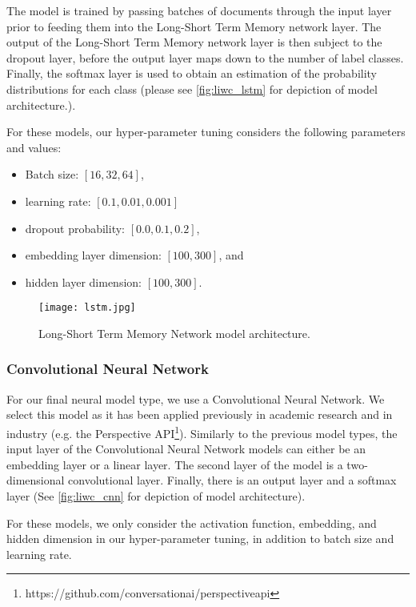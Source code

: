 The model is trained by passing batches of documents through the input layer prior to feeding them into the Long-Short Term Memory network layer. The output of the Long-Short Term Memory network layer is then subject to the dropout layer, before the output layer maps down to the number of label classes. Finally, the softmax layer is used to obtain an estimation of the probability distributions for each class (please see \autoref{fig:liwc_lstm} for depiction of model architecture.).

For these models, our hyper-parameter tuning considers the following parameters and values:

\begin{itemize}
  \item Batch size: $[16, 32, 64]$,
  \item learning rate: $[0.1, 0.01, 0.001]$
  \item dropout probability: $[0.0, 0.1, 0.2]$,
  \item embedding layer dimension: $[100, 300]$, and
  \item hidden layer dimension: $[100, 300]$.
\end{itemize}

\begin{figure}
  \centering
  \texttt{[image: lstm.jpg]}
  \caption{Long-Short Term Memory Network model architecture.}
  \label{fig:liwc_lstm}
\end{figure}

\subsubsection{Convolutional Neural Network}

For our final neural model type, we use a Convolutional Neural Network. We select this model as it has been applied previously in academic research \cite{CITE: CNN papers} and in industry (e.g. the Perspective API\footnote{https://github.com/conversationai/perspectiveapi}). Similarly to the previous model types, the input layer of the Convolutional Neural Network models can either be an embedding layer or a linear layer. The second layer of the model is a two-dimensional convolutional layer. Finally, there is an output layer and a softmax layer (See \autoref{fig:liwc_cnn} for depiction of model architecture).

For these models, we only consider the activation function, embedding, and hidden dimension in our hyper-parameter tuning, in addition to batch size and learning rate.

